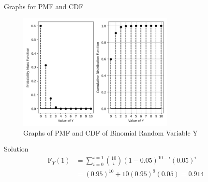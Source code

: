 \documentclass{beamer}
\providecommand{\cdf}[2]{\ensuremath{\text{F}_{#1}\left(#2\right)}}
\begin{document}
\begin{frame}{Graphs for PMF and CDF}
	\begin{figure}
		\includegraphics[height=0.7\textheight, width=0.7\textwidth, keepaspectratio]{figs/9_1.png}
		\caption{Graphs of PMF and CDF of Binomial Random Variable Y}
		\label{fig:pmf-cdf}
	\end{figure}
\end{frame}

\begin{frame}{Solution}
	\begin{align}
		\cdf{Y}{1} &= \sum_{i = 0}^{i = 1}\binom{10}{i}(1 - 0.05)^{10 - i}(0.05)^i \\
		&= (0.95)^{10} + 10(0.95)^9(0.05) = 0.914
	\end{align}
\end{frame}
\end{document}
